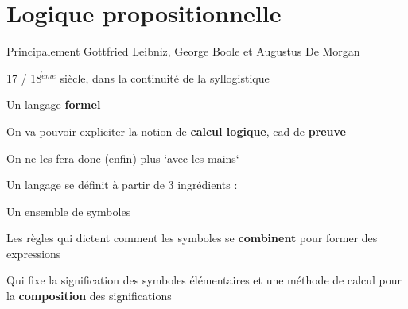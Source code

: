 \section{Logique propositionnelle}


\begin{frame}
	
	\begin{description}[labelindent=6pt,style=multiline,leftmargin=1.3in]
		 \setlength\itemsep{1.4em}
		 
		 \item[Qui] Principalement Gottfried Leibniz, George Boole et Augustus De Morgan
		 \pause
		 \item[Quand] 17 / 18$^{\grave{e}me}$ siècle, dans la continuité de la syllogistique\pause
		 \item[Quoi] Un langage \textbf{formel}\pause
		 \item[] On va pouvoir expliciter la notion de \textbf{calcul logique}, cad de \textbf{preuve}\pause
		 \item[] On ne les fera donc (enfin) plus `avec les mains` 
		 
	\end{description}
\end{frame}

\begin{frame}
	
	Un langage se définit à partir de 3 ingrédients :\newline\pause
	
	\begin{description}[labelindent=6pt,style=multiline,leftmargin=1.3in]
		 \setlength\itemsep{1.4em}
		 
		 \item[Un alphabet] Un ensemble de symboles		 
		 \pause
		 \item[Une syntaxe] Les règles qui dictent comment les symboles se \textbf{combinent} pour former des expressions\pause
		 \item[Une sémantique] Qui fixe la signification des symboles élémentaires et une méthode de calcul pour la \textbf{composition} des significations
	\end{description}
\end{frame}




